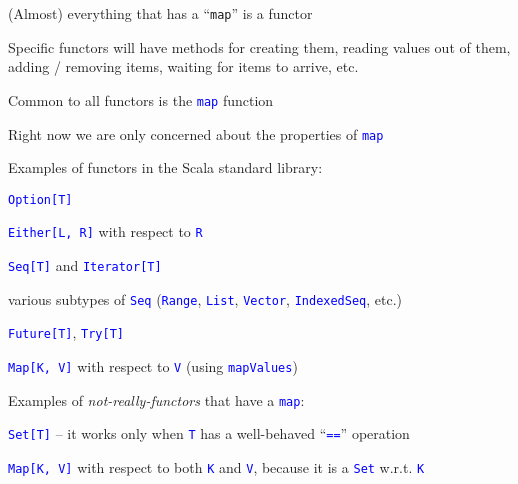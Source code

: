 (Almost) everything that has a ``\texttt{map}'' is a functor

Specific functors will have methods for creating them, reading values
out of them, adding / removing items, waiting for items to arrive,
etc.

Common to all functors is the \texttt{\textcolor{blue}{\footnotesize{}map}}
function

Right now we are only concerned about the properties of \texttt{\textcolor{blue}{\footnotesize{}map}}{\footnotesize\par}

Examples of functors in the Scala standard library:

\texttt{\textcolor{blue}{\footnotesize{}Option{[}T{]}}}{\footnotesize\par}

\texttt{\textcolor{blue}{\footnotesize{}Either{[}L, R{]}}} with respect
to \texttt{\textcolor{blue}{\footnotesize{}R}}{\footnotesize\par}

\texttt{\textcolor{blue}{\footnotesize{}Seq{[}T{]}}} and \texttt{\textcolor{blue}{\footnotesize{}Iterator{[}T{]} }}{\footnotesize\par}

various subtypes of \texttt{\textcolor{blue}{\footnotesize{}Seq}}
(\texttt{\textcolor{blue}{\footnotesize{}Range}}, \texttt{\textcolor{blue}{\footnotesize{}List}},
\texttt{\textcolor{blue}{\footnotesize{}Vector}}, \texttt{\textcolor{blue}{\footnotesize{}IndexedSeq}},
etc.)

\texttt{\textcolor{blue}{\footnotesize{}Future{[}T{]}}}, \texttt{\textcolor{blue}{\footnotesize{}Try{[}T{]}}}{\footnotesize\par}

\texttt{\textcolor{blue}{\footnotesize{}Map{[}K, V{]}}} with respect
to \texttt{\textcolor{blue}{\footnotesize{}V}} (using \texttt{\textcolor{blue}{\footnotesize{}mapValues}})

Examples of \emph{not-really-functors} that have a \texttt{\textcolor{blue}{\footnotesize{}map}}:

\texttt{\textcolor{blue}{\footnotesize{}Set{[}T{]}}} – it works only
when \texttt{\textcolor{blue}{\footnotesize{}T}} has a well-behaved
``\texttt{\textcolor{blue}{\footnotesize{}==}}'' operation

\texttt{\textcolor{blue}{\footnotesize{}Map{[}K, V{]}}} with respect
to both \texttt{\textcolor{blue}{\footnotesize{}K}} and \texttt{\textcolor{blue}{\footnotesize{}V}},
because it is a \texttt{\textcolor{blue}{\footnotesize{}Set}} w.r.t.
\texttt{\textcolor{blue}{\footnotesize{}K}}{\footnotesize\par}

